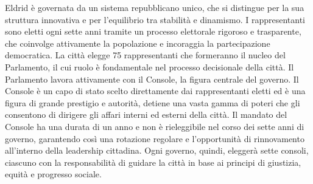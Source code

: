 Eldrid è governata da un sistema repubblicano unico, che si distingue
per la sua struttura innovativa e per l'equilibrio tra stabilità e
dinamismo. I rappresentanti sono eletti ogni sette anni tramite un
processo elettorale rigoroso e trasparente, che coinvolge attivamente la
popolazione e incoraggia la partecipazione democratica. La città elegge
75 rappresentanti che formeranno il nucleo del Parlamento, il cui ruolo
è fondamentale nel processo decisionale della città. Il Parlamento
lavora attivamente con il Console, la figura centrale del governo. Il
Console è un capo di stato scelto direttamente dai rappresentanti eletti
ed è una figura di grande prestigio e autorità, detiene una vasta gamma
di poteri che gli consentono di dirigere gli affari interni ed esterni
della città. Il mandato del Console ha una durata di un anno e non è
rieleggibile nel corso dei sette anni di governo, garantendo così una
rotazione regolare e l'opportunità di rinnovamento all'interno della
leadership cittadina. Ogni governo, quindi, eleggerà sette consoli,
ciascuno con la responsabilità di guidare la città in base ai principi
di giustizia, equità e progresso sociale.
